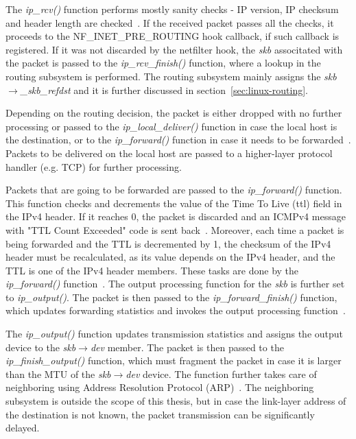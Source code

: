 The {\it{ip\_rcv()}} function performs mostly sanity checks -
IP version, IP checksum and header length are checked~\cite{kernel-source}.
If the received packet passes all the checks, it proceeds to the NF\_INET\_PRE\_ROUTING hook callback,
if such callback is registered.
If it was not discarded by the netfilter hook,
the {\it{skb}} associtated with the packet is passed to the {\it{ip\_rcv\_finish()}} function,
where a lookup in the routing subsystem is performed.
The routing subsystem mainly assigns the {\it{skb$\rightarrow$\_skb\_refdst}} and it is further discussed in section~\ref{sec:linux-routing}.

Depending on the routing decision, the packet is either dropped with no further processing
or passed to the {\it{ip\_local\_deliver()}} function in case
the local host is the destination, or to the {\it{ip\_forward()}} function in case it needs to be forwarded~\cite{linux-kernel-networking}.
Packets to be delivered on the local host are passed to a higher-layer protocol handler (e.g. TCP)
for further processing.

Packets that are going to be forwarded are passed to the {\it{ip\_forward()}} function.
This function checks and decrements the value of the Time To Live (ttl) field in the IPv4 header.
If it reaches 0, the packet is discarded and an ICMPv4 message with "TTL Count Exceeded" code is sent back~\cite{linux-kernel-networking}.
Moreover, each time a packet is being
forwarded and the TTL is decremented by 1,
the checksum of the IPv4 header must be recalculated,
as its value depends on the IPv4 header, and the TTL is one of the IPv4 header members.
These tasks are done by the {\it{ip\_forward()}} function~\cite{linux-kernel-networking}.
The output processing function for the {\it{skb}} is further set to {\it{ip\_output()}}.
The packet is then passed to the {\it{ip\_forward\_finish()}} function,
which updates forwarding statistics and invokes the output processing function~\cite{linux-kernel-networking}.

The {\it{ip\_output()}} function updates transmission statistics and
assigns the output device to the {\it{skb$\rightarrow$dev}} member.
The packet is then passed to the {\it{ip\_finish\_output()}} function,
which must fragment the packet in case it is larger than the MTU of the {\it{skb$\rightarrow$dev}} device.
The function further takes care of neighboring using Address Resolution Protocol (ARP)~\cite{kernel-source}.
The neighboring subsystem is outside the scope of this thesis,
but in case the link-layer address of the destination is not known,
the packet transmission can be significantly delayed.
